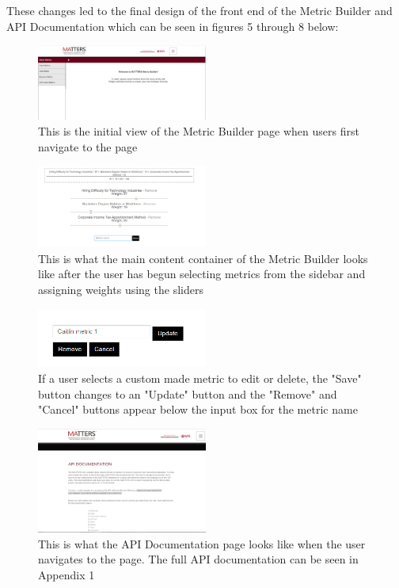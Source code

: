 	These changes led to the final design of the front end of the Metric Builder and API Documentation which can be seen in figures 5 through 8 below:

		\begin{figure}[!ht]
			\centering
			\includegraphics[width=0.5\textwidth]{images/mb.png}
		\caption{This is the initial view of the Metric Builder page when users first navigate to the page}
		\end{figure}
		
			\begin{figure}[!ht]
				\centering
				\includegraphics[width=0.5\textwidth]{images/using.png}
			\caption{This is what the main content container of the Metric Builder looks like after the user has begun selecting metrics from the sidebar and assigning weights using the sliders}
		\end{figure}
		
			\begin{figure}[!ht]
				\centering
				\includegraphics[width=0.5\textwidth]{images/saved.png}
			\caption{If a user selects a custom made metric to edit or delete, the "Save" button changes to an "Update" button and the "Remove" and "Cancel" buttons appear below the input box for the metric name}
		\end{figure}
		
			\begin{figure}[!ht]
				\centering
				\includegraphics[width=0.5\textwidth]{images/api.png}
			\caption{This is what the API Documentation page looks like when the user navigates to the page. The full API documentation can be seen in Appendix 1}
		\end{figure}